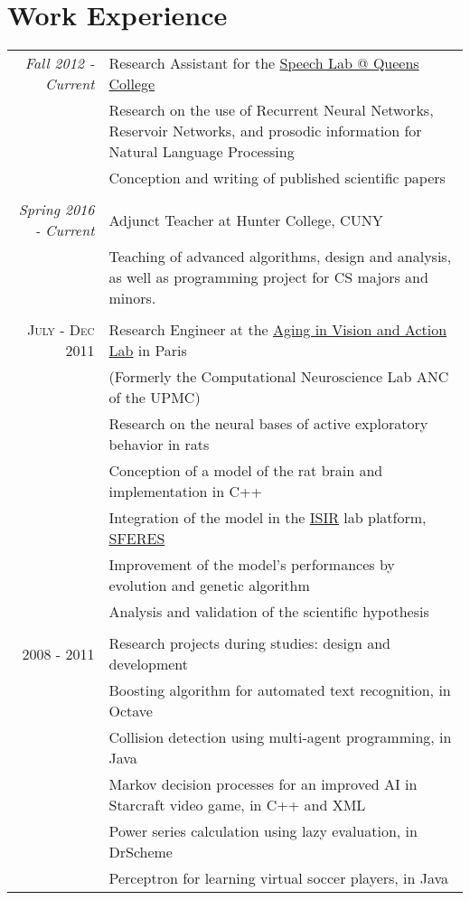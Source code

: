 \documentclass[a4paper,10pt]{article}
\begin{document}
\section{Work Experience}
\begin{tabular}{r|p{13cm}}
 \emph{Fall 2012 - Current} & Research Assistant for the \href{http://speech.cs.qc.cuny.edu/}{Speech Lab @ Queens College}\\
& \footnotesize{Research on the use of Recurrent Neural Networks, Reservoir Networks, and prosodic information for Natural Language Processing}\\
& \footnotesize{Conception and writing of published scientific papers}\\
\multicolumn{2}{c}{} \\

\emph{Spring 2016 - Current} &  Adjunct Teacher at Hunter College, CUNY\\
& \footnotesize{Teaching of advanced algorithms, design and analysis, as well as programming project for CS majors and minors.}\\
\multicolumn{2}{c}{} \\

\textsc{July - Dec 2011 } & Research Engineer at the \href{http://www.aging-vision-action.fr/}{Aging in Vision and Action Lab} in Paris\\
& \footnotesize{(Formerly the Computational Neuroscience Lab ANC of the UPMC)}\\
& \footnotesize{Research on the neural bases of active exploratory behavior in rats}\\
& \footnotesize{Conception of a model of the rat brain and implementation in C++}\\
& \footnotesize{Integration of the model in the \href{http://www.isir.upmc.fr/}{ISIR} lab platform, \href{https://github.com/sferes2/sferes2}{SFERES}}\\
& \footnotesize{Improvement of the model's performances by evolution and genetic algorithm}\\
& \footnotesize{Analysis and validation of the scientific hypothesis}\\
\multicolumn{2}{c}{} \\

\textsc{2008 - 2011} & Research projects during studies: design and development\\
& \footnotesize{Boosting algorithm for automated text recognition, in Octave}\\
& \footnotesize{Collision detection using multi-agent programming, in Java}\\
& \footnotesize{Markov decision processes for an  improved AI in Starcraft video game, in C++ and XML}\\
& \footnotesize{Power series calculation using lazy evaluation, in DrScheme}\\
& \footnotesize{Perceptron for learning virtual soccer players, in Java}\\

\end{tabular}\\
\end{document}
